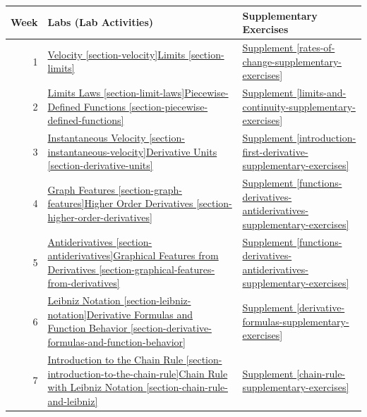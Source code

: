 \documentclass[12pt,]{book}
\theoremstyle{plain}
\theoremstyle{definition}
\numberwithin{equation}{section}
\begin{document}
\newline{}\begin{tabular}{rp{3in}p{1.1in}}
\toprule
Week&Labs (Lab Activities)&Supplementary Exercises\\
\midrule
1&\hyperref[section-velocity]{Velocity \ref{section-velocity}}\textendash{}\hyperref[section-limits]{Limits \ref{section-limits}}&\hyperref[rates-of-change-supplementary-exercises]{Supplement \ref{rates-of-change-supplementary-exercises}}\\
\midrule
2&\hyperref[section-limit-laws]{Limits Laws \ref{section-limit-laws}}\textendash{}\hyperref[section-piecewise-defined-functions]{Piecewise-Defined Functions \ref{section-piecewise-defined-functions}}&\hyperref[limits-and-continuity-supplementary-exercises]{Supplement \ref{limits-and-continuity-supplementary-exercises}}\\
\midrule
3&\hyperref[section-instantaneous-velocity]{Instantaneous Velocity \ref{section-instantaneous-velocity}}\textendash{}\hyperref[section-derivative-units]{Derivative Units \ref{section-derivative-units}}&\hyperref[introduction-first-derivative-supplementary-exercises]{Supplement \ref{introduction-first-derivative-supplementary-exercises}}\\
\midrule
4&\hyperref[section-graph-features]{Graph Features \ref{section-graph-features}}\textendash{}\hyperref[section-higher-order-derivatives]{Higher Order Derivatives \ref{section-higher-order-derivatives}}&\hyperref[functions-derivatives-antiderivatives-supplementary-exercises]{Supplement \ref{functions-derivatives-antiderivatives-supplementary-exercises}}\\
\midrule
5&\hyperref[section-antiderivatives]{Antiderivatives \ref{section-antiderivatives}}\textendash{}\hyperref[section-graphical-features-from-derivatives]{Graphical Features from Derivatives \ref{section-graphical-features-from-derivatives}}&\hyperref[functions-derivatives-antiderivatives-supplementary-exercises]{Supplement \ref{functions-derivatives-antiderivatives-supplementary-exercises}}\\
\midrule
6&\hyperref[section-leibniz-notation]{Leibniz Notation \ref{section-leibniz-notation}}\textendash{}\hyperref[section-derivative-formulas-and-function-behavior]{Derivative Formulas and Function Behavior \ref{section-derivative-formulas-and-function-behavior}}&\hyperref[derivative-formulas-supplementary-exercises]{Supplement \ref{derivative-formulas-supplementary-exercises}}\\
\midrule
7&\hyperref[section-introduction-to-the-chain-rule]{Introduction to the Chain Rule \ref{section-introduction-to-the-chain-rule}}\textendash{}\hyperref[section-chain-rule-and-leibniz]{Chain Rule with Leibniz Notation \ref{section-chain-rule-and-leibniz}}&\hyperref[chain-rule-supplementary-exercises]{Supplement \ref{chain-rule-supplementary-exercises}}\\

\end{tabular}
\end{document}
